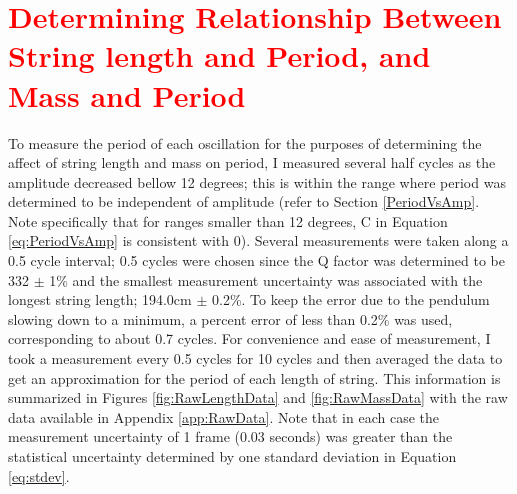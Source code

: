 \documentclass[11pt]{article}
\begin{document}
    \section{\textcolor{red}{Determining Relationship Between String length and Period, and Mass and Period}}\label{sec:Lab4Main}
    To measure the period of each oscillation for the purposes of determining the affect of string length and mass on period, I measured several half cycles as the amplitude decreased bellow 12 degrees; this is within the range where period was determined to be independent of amplitude (refer to Section \ref{PeriodVsAmp}. Note specifically that for ranges smaller than 12 degrees, C in Equation \ref{eq:PeriodVsAmp} is consistent with 0). Several measurements were taken along a 0.5 cycle interval; 0.5 cycles were chosen since the Q factor was determined to be 332 $\pm$ 1\% and the smallest measurement uncertainty was associated with the longest string length; 194.0cm $\pm$ 0.2\%. To keep the error due to the pendulum slowing down to a minimum, a percent error of less than 0.2\% was used, corresponding to about 0.7 cycles. For convenience and ease of measurement, I took a measurement every 0.5 cycles for 10 cycles and then averaged the data to get an approximation for the period of each length of string. This information is summarized in Figures \ref{fig:RawLengthData} and \ref{fig:RawMassData} with the raw data available in Appendix \ref{app:RawData}. Note that in each case the measurement uncertainty of 1 frame (0.03 seconds) was greater than the statistical uncertainty determined by one standard deviation in Equation \ref{eq:stdev}.
        
\end{document}
